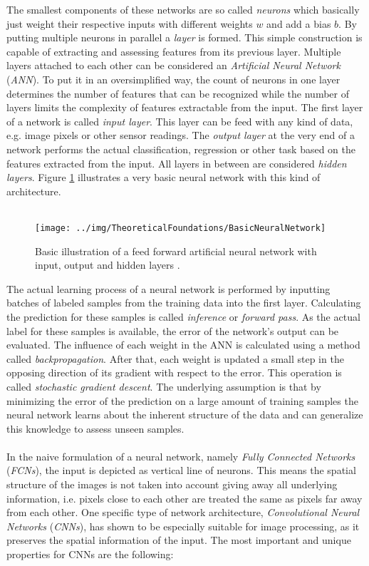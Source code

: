 The smallest components of these networks are so called \textit{neurons} which basically just weight their respective inputs with different weights $w$ and add a bias $b$. By putting multiple neurons in parallel a \textit{layer} is formed. This simple construction is capable of extracting and assessing features from its previous layer. Multiple layers attached to each other can be considered an \textit{Artificial Neural Network} (\textit{ANN}). To put it in an oversimplified way, the count of neurons in one layer determines the number of features that can be recognized while the number of layers limits the complexity of features extractable from the input. The first layer of a network is called \textit{input layer}. This layer can be feed with any kind of data, e.g. image pixels or other sensor readings. The \textit{output layer} at the very end of a network performs the actual classification, regression or other task based on the features extracted from the input. All layers in between are considered \textit{hidden layers}. Figure \ref{fig:BasicNeuralNetwork} illustrates a very basic neural network with this kind of architecture. \\
\\
\begin{figure}[H]
\texttt{[image: ../img/TheoreticalFoundations/BasicNeuralNetwork]}
\caption{Basic illustration of a feed forward artificial neural network with input, output and hidden layers \cite{nielsenneural}.}
\label{fig:BasicNeuralNetwork}
\end{figure}
\noindent The actual learning process of a neural network is performed by inputting batches of labeled samples from the training data into the first layer. Calculating the prediction for these samples is called \textit{inference} or \textit{forward pass}. As the actual label for these samples is available, the error of the network's output can be evaluated. The influence of each weight in the ANN is calculated using a method called \textit{backpropagation}. After that, each weight is updated a small step in the opposing direction of its gradient with respect to the error. This operation is called \textit{stochastic gradient descent}. The underlying assumption is that by minimizing the error of the prediction on a large amount of training samples the neural network learns about the inherent structure of the data and can generalize this knowledge to assess unseen samples.\\
\\
In the naive formulation of a neural network, namely \textit{Fully Connected Networks} (\textit{FCNs}), the input is depicted as vertical line of neurons. This means the spatial structure of the images is not taken into account giving away all underlying information, i.e. pixels close to each other are treated the same as pixels far away from each other. One specific type of network architecture, \textit{Convolutional Neural Networks} (\textit{CNNs}), has shown to be especially suitable for image processing, as it preserves the spatial information of the input. The most important and unique properties for CNNs are the following:
